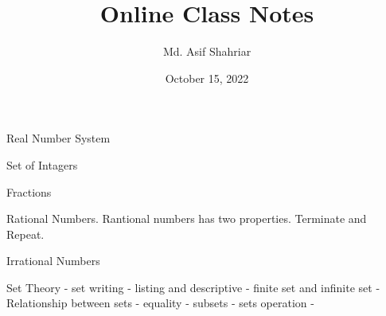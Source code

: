 \documentclass[11pt]{article}
\begin{document}
\title{Online Class Notes}
\author{Md. Asif Shahriar}
\date{October 15, 2022}
\maketitle
Real Number System 

Set of Intagers 

Fractions 

Rational Numbers. Rantional numbers has two properties. Terminate and Repeat. 

Irrational Numbers

Set Theory - set writing - listing and descriptive - finite set and infinite set - Relationship between sets - equality - subsets - sets operation - 
\end{document}
